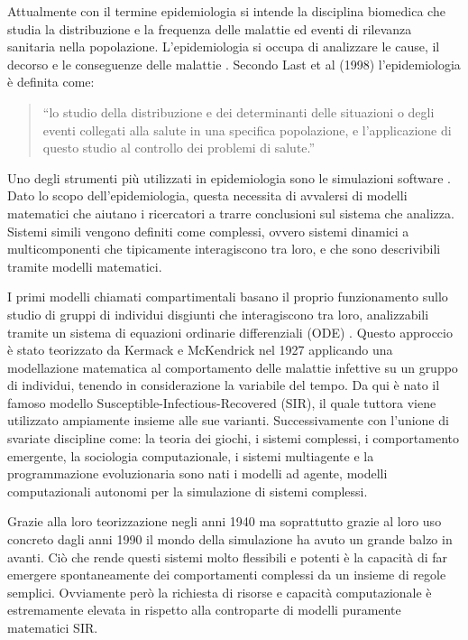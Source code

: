 Attualmente con il termine epidemiologia si intende la 
disciplina biomedica che studia la distribuzione e la 
frequenza delle malattie ed eventi di rilevanza sanitaria 
nella popolazione. L’epidemiologia si occupa di analizzare 
le cause, il decorso e le conseguenze delle malattie \cite{wiki:Epidemiologia}. 
Secondo Last et al (1998) l’epidemiologia è definita come: 

\begin{quotation}
    “lo studio della distribuzione e dei determinanti 
    delle situazioni o degli eventi collegati alla salute 
    in una specifica popolazione, e l'applicazione di 
    questo studio al controllo dei problemi di salute.”
\end{quotation}

Uno degli strumenti più utilizzati in epidemiologia sono le 
simulazioni software \cite{wiki:Simulation_software}. 
Dato lo scopo dell’epidemiologia, questa necessita di 
avvalersi di modelli matematici \cite{doi:10.4161/viru.24041} 
che aiutano i ricercatori a trarre conclusioni sul sistema 
che analizza. Sistemi simili vengono definiti come complessi,
\cite{Galea2009-lj} \cite{Ladyman2013} ovvero sistemi dinamici a 
multicomponenti che tipicamente interagiscono tra loro, 
e che sono descrivibili tramite modelli matematici. 

I primi modelli chiamati compartimentali \cite{Bjørnstad2020} 
basano il proprio funzionamento sullo studio di gruppi di 
individui disgiunti che interagiscono tra loro, 
analizzabili tramite un sistema di equazioni ordinarie 
differenziali (ODE) \cite{Brauer2008}. 
Questo approccio è stato teorizzato da Kermack e McKendrick nel 1927 applicando 
una modellazione matematica al comportamento delle malattie infettive su un gruppo di individui, 
tenendo in considerazione la variabile del tempo. 
Da qui è nato il famoso modello Susceptible-Infectious-Recovered (SIR), 
il quale tuttora viene utilizzato ampiamente insieme alle sue varianti. 
Successivamente con l’unione di svariate discipline come: 
la teoria dei giochi, i sistemi complessi, i comportamento emergente, 
la sociologia computazionale, i sistemi multiagente e la programmazione evoluzionaria 
sono nati i modelli ad agente, modelli computazionali autonomi per la simulazione di sistemi complessi. 

Grazie alla loro teorizzazione negli anni 1940 ma soprattutto grazie al loro uso concreto dagli 
anni 1990 il mondo della simulazione ha avuto un grande balzo in avanti. 
Ciò che rende questi sistemi molto flessibili e potenti è la capacità di 
far emergere spontaneamente dei comportamenti complessi da un insieme di regole semplici. 
Ovviamente però la richiesta di risorse e capacità computazionale è estremamente elevata 
in rispetto alla controparte di modelli puramente matematici SIR. 

